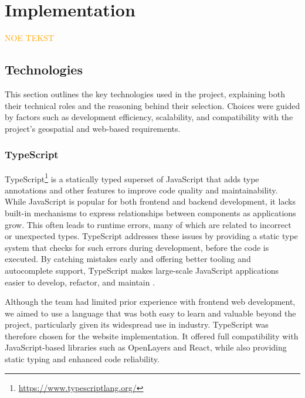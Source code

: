 \chapter{Implementation}\label{chap:implementation}

\textcolor{orange}{NOE TEKST}

\section{Technologies}

This section outlines the key technologies used in the project, explaining both their technical roles and the reasoning behind their selection. Choices were guided by factors such as development efficiency, scalability, and compatibility with the project's geospatial and web-based requirements.

\subsection{TypeScript}

TypeScript\footnote{\url{https://www.typescriptlang.org/}} is a statically typed superset of JavaScript that adds type annotations and other features to improve code quality and maintainability. While JavaScript is popular for both frontend and backend development, it lacks built-in mechanisms to express relationships between components as applications grow. This often leads to runtime errors, many of which are related to incorrect or unexpected types. TypeScript addresses these issues by providing a static type system that checks for such errors during development, before the code is executed. By catching mistakes early and offering better tooling and autocomplete support, TypeScript makes large-scale JavaScript applications easier to develop, refactor, and maintain \cite{typescript_handbook}. 

Although the team had limited prior experience with frontend web development, we aimed to use a language that was both easy to learn and valuable beyond the project, particularly given its widespread use in industry. TypeScript was therefore chosen for the website implementation. It offered full compatibility with JavaScript-based libraries such as OpenLayers and React, while also providing static typing and enhanced code reliability.

